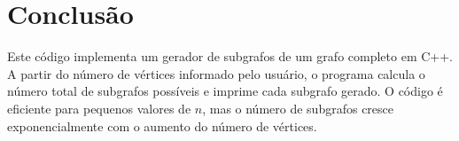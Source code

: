 \documentclass{article}
\begin{document}
\section{Conclusão}

Este código implementa um gerador de subgrafos de um grafo completo em C++. A partir do número de vértices informado pelo usuário, o programa calcula o número total de subgrafos possíveis e imprime cada subgrafo gerado. O código é eficiente para pequenos valores de \( n \), mas o número de subgrafos cresce exponencialmente com o aumento do número de vértices.
\end{document}
